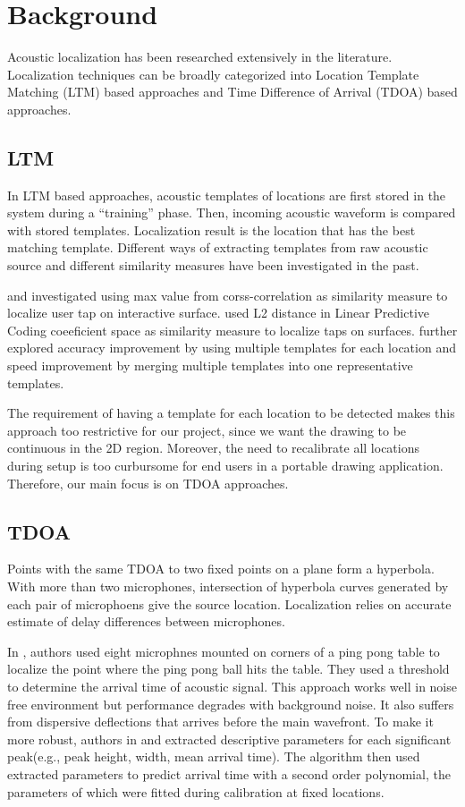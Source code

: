 \section{Background}
Acoustic localization has been researched extensively in the literature. Localization techniques can be broadly categorized into Location Template Matching (LTM) based approaches and Time Difference of Arrival (TDOA) based approaches.

\subsection{LTM}
In LTM based approaches, acoustic templates of locations are first stored in the system during a ``training'' phase. Then, incoming acoustic waveform is compared with stored templates. Localization result is the location that has the best matching template. Different ways of extracting templates from raw acoustic source and different similarity measures have been investigated in the past. 

\cite{extended:tusi} and \cite{ltm:pham} investigated using max value from corss-correlation as similarity measure to localize user tap on interactive surface. \cite{ltm:lpc} used L2 distance in Linear Predictive Coding coeeficient space as similarity measure to localize taps on surfaces. \cite{ltm:tusi2} further explored accuracy improvement by using multiple templates for each location and speed improvement by merging multiple templates into one representative templates.

The requirement of having a template for each location to be detected makes this approach too restrictive for our project, since we want the drawing to be continuous in the 2D region.  Moreover, the need to recalibrate all locations during setup is too curbursome for end users in a portable drawing application. Therefore, our main focus is on TDOA approaches.

\subsection{TDOA}
Points with the same TDOA to two fixed points on a plane form a hyperbola. With more than two microphones, intersection of hyperbola curves generated by each pair of microphoens give the source location.  Localization relies on accurate estimate of delay differences between microphones. 

In \cite{tdoa:ppp}, authors used eight microphnes mounted on corners of a ping pong table to localize the point where the ping pong ball hits the table. They used a threshold to determine the arrival time of acoustic signal. This approach works well in noise free environment but performance degrades with background noise. It also suffers from dispersive deflections that arrives before the main wavefront. To make it more robust, authors in \cite{tdoa:mit3} and \cite{tdoa:mit4} extracted descriptive parameters for each significant peak(e.g., peak height, width, mean arrival time). The algorithm then used extracted parameters to predict arrival time with a second order polynomial, the parameters of which were fitted during calibration at fixed locations.

